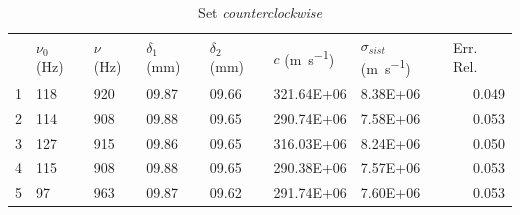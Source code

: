 \documentclass[a4paper,11pt]{article}
\begin{document}
	\begin{table}[htbp]
		\centering
		\caption{Set \emph{counterclockwise}}
		\vspace{0.1cm}
		\begin{tabular}{rllllllr}
			\rowcolor[rgb]{ .741,  .843,  .933} \multicolumn{1}{l}{Indice} & $\nu_0$ (\si{\hertz}) & $\nu$ (\si{\hertz}) & $\delta_1$ (\si{\milli\meter}) & $\delta_2$ (\si{\milli\meter}) & $c$ (\si{\meter\per\second}) & $\sigma_{sist}$ (\si{\meter\per\second}) & \multicolumn{1}{l}{Err. Rel.} \\
			\rowcolor[rgb]{ .741,  .843,  .933} 1     & \cellcolor[rgb]{ .859,  .859,  .859} \num{118} & \cellcolor[rgb]{ .859,  .859,  .859} \num{920} & \cellcolor[rgb]{ .859,  .859,  .859} \num{09.87} & \cellcolor[rgb]{ .859,  .859,  .859} \num{09.66} & \cellcolor[rgb]{ .859,  .859,  .859} \num{321.64E+06} & \cellcolor[rgb]{ .859,  .859,  .859} \num{8.38E+06} & \cellcolor[rgb]{ .859,  .859,  .859} 0.049 \\
			\rowcolor[rgb]{ .741,  .843,  .933} 2     & \cellcolor[rgb]{ .929,  .929,  .929} \num{114} & \cellcolor[rgb]{ .929,  .929,  .929} \num{908} & \cellcolor[rgb]{ .929,  .929,  .929} \num{09.88} & \cellcolor[rgb]{ .929,  .929,  .929} \num{09.65} & \cellcolor[rgb]{ .929,  .929,  .929} \num{290.74E+06} & \cellcolor[rgb]{ .929,  .929,  .929} \num{7.58E+06} & \cellcolor[rgb]{ .929,  .929,  .929} 0.053 \\
			\rowcolor[rgb]{ .741,  .843,  .933} 3     & \cellcolor[rgb]{ .859,  .859,  .859} \num{127} & \cellcolor[rgb]{ .859,  .859,  .859} \num{915} & \cellcolor[rgb]{ .859,  .859,  .859} \num{09.86} & \cellcolor[rgb]{ .859,  .859,  .859} \num{09.65} & \cellcolor[rgb]{ .859,  .859,  .859} \num{316.03E+06} & \cellcolor[rgb]{ .859,  .859,  .859} \num{8.24E+06} & \cellcolor[rgb]{ .859,  .859,  .859} 0.050 \\
			\rowcolor[rgb]{ .741,  .843,  .933} 4     & \cellcolor[rgb]{ .929,  .929,  .929} \num{115} & \cellcolor[rgb]{ .929,  .929,  .929} \num{908} & \cellcolor[rgb]{ .929,  .929,  .929} \num{09.88} & \cellcolor[rgb]{ .929,  .929,  .929} \num{09.65} & \cellcolor[rgb]{ .929,  .929,  .929} \num{290.38E+06} & \cellcolor[rgb]{ .929,  .929,  .929} \num{7.57E+06} & \cellcolor[rgb]{ .929,  .929,  .929} 0.053 \\
			\rowcolor[rgb]{ .741,  .843,  .933} 5     & \cellcolor[rgb]{ .859,  .859,  .859} \num{97} & \cellcolor[rgb]{ .859,  .859,  .859} \num{963} & \cellcolor[rgb]{ .859,  .859,  .859} \num{09.87} & \cellcolor[rgb]{ .859,  .859,  .859} \num{09.62} & \cellcolor[rgb]{ .859,  .859,  .859} \num{291.74E+06} & \cellcolor[rgb]{ .859,  .859,  .859} \num{7.60E+06} & \cellcolor[rgb]{ .859,  .859,  .859} 0.053 \\

\end{tabular}
\end{table}
\end{document}

